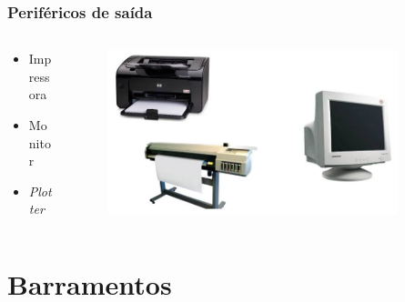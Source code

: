 \documentclass[aspectratio=169,
				xcolor=table]{beamer}
\begin{document}
	\begin{frame}
		\frametitle{Periféricos de saída}
		\begin{columns}
			\begin{column}{0.35\textwidth}
				\vspace{-1cm}
				\begin{itemize}
					\item Impressora
					\item Monitor
					\item \textit{Plotter}
					
				\end{itemize}
			\end{column}
			\begin{column}{0.65\textwidth}
				\begin{figure}
					\centering
					\includegraphics[width=0.9\textwidth, keepaspectratio]{../figs/cap04/saida} 
					
				\end{figure}
			\end{column}
		\end{columns}
	\end{frame}
	
	\section{Barramentos}
	
\end{document}
